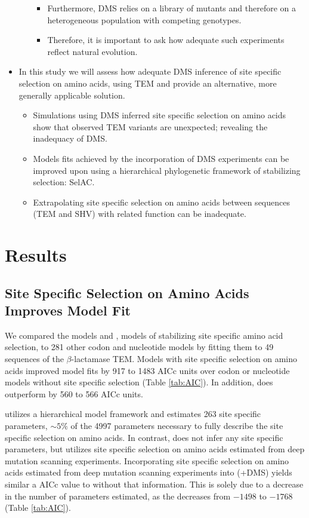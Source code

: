 \documentclass[12pt]{article}
\begin{document}
\begin{itemize}
\begin{itemize}
\begin{itemize}
			\item Furthermore, DMS relies on a library of mutants and therefore on a heterogeneous population with competing genotypes.
			\item Therefore, it is important to ask how adequate such experiments reflect natural evolution. 
		\end{itemize}
	\end{itemize}
	\item In this study we will assess how adequate DMS inference of site specific selection on amino acids, using TEM and provide an alternative, more generally applicable solution.
	\begin{itemize}
		\item Simulations using DMS inferred site specific selection on amino acids show that observed TEM variants are unexpected; revealing the inadequacy of DMS.
		\item Models fits achieved by the incorporation of DMS experiments can be improved upon using a hierarchical phylogenetic framework of stabilizing selection: SelAC.
		\item Extrapolating site specific selection on amino acids between sequences (TEM and SHV) with related function can be inadequate.
	\end{itemize}
\end{itemize}

\section*{Results}
\subsection*{Site Specific Selection on Amino Acids Improves Model Fit}
We compared the models \phydms and \selac, models of stabilizing site specific amino acid selection, to 281 other codon and nucleotide models by fitting them to 49 sequences of the $\beta$-lactamase TEM.
Models with site specific selection on amino acids improved model fits by 917 to 1483 AICc units over codon or nucleotide models without site specific selection (Table \ref{tab:AIC}).
In addition, \selac does outperform \phydms by 560 to  566 AICc units.

\selac utilizes a hierarchical model framework and estimates 263 site specific parameters, $\sim5\%$ of the 4997 parameters necessary to fully describe the site specific selection on amino acids.
In contrast, \phydms does not infer any site specific parameters, but utilizes site specific selection on amino acids estimated from deep mutation scanning experiments.
Incorporating site specific selection on amino acids estimated from deep mutation scanning experiments into \selac (\selac+DMS) yields similar a AICc value to \selac without that information.
This is solely due to a decrease in the number of parameters estimated, as the \LLik decreases from $-1498$ to $-1768$ (Table \ref{tab:AIC}).
\end{document}
